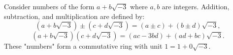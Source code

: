 Consider numbers of the form $a + b\sqrt{-3}$ where $a, b$ are integers. Addition, subtraction, and multiplication are defined by:
$$(a + b\sqrt{-3}) \pm (c + d\sqrt{-3}) = (a \pm c) + (b \pm d)\sqrt{-3},$$
$$(a + b\sqrt{-3})(c + d\sqrt{-3}) = (ac - 3bd) + (ad + bc)\sqrt{-3}.$$
These "numbers" form a commutative ring with unit $1 = 1 + 0\sqrt{-3}$.
